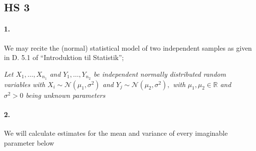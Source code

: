 \documentclass[
]{article}
\newenvironment{Shaded}{\begin{snugshade}}{\end{snugshade}}
\newcommand{\CommentTok}[1]{\textcolor[rgb]{0.56,0.35,0.01}{\textit{#1}}}
\newcommand{\KeywordTok}[1]{\textcolor[rgb]{0.13,0.29,0.53}{\textbf{#1}}}
\newcommand{\NormalTok}[1]{#1}
\newcommand{\OperatorTok}[1]{\textcolor[rgb]{0.81,0.36,0.00}{\textbf{#1}}}
\begin{document}
\hypertarget{hs-3}{%
\subsection{HS 3}\label{hs-3}}

\hypertarget{section-9}{%
\paragraph{\texorpdfstring{\textbf{1.}}{1.}}\label{section-9}}

We may recite the (normal) statistical model of two independent samples
as given in D. 5.1 of ``Introduktion til Statistik'';

\emph{Let \(X_1,\ldots,X_{n_1}\) and \(Y_1,\ldots,Y_{n_2}\) be
independent normally distributed random variables with
\(X_i\sim\mathcal{N}(\mu_1,\sigma^2)\) and
\(Y_j\sim\mathcal{N}(\mu_2,\sigma^2),\) with
\(\mu_1,\mu_2\in\mathbb{R}\) and \(\sigma^2>0\) being unknown
parameters}

\hypertarget{section-10}{%
\paragraph{\texorpdfstring{\textbf{2.}}{2.}}\label{section-10}}

We will calculate estimates for the mean and variance of every
imaginable parameter below

\begin{Shaded}
\end{Shaded}
\end{document}
